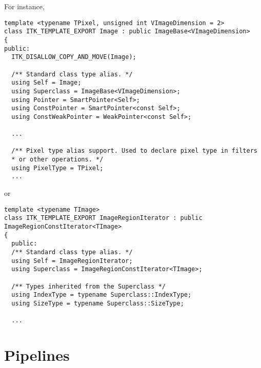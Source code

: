 For instance,

\small
\begin{verbatim}
template <typename TPixel, unsigned int VImageDimension = 2>
class ITK_TEMPLATE_EXPORT Image : public ImageBase<VImageDimension>
{
public:
  ITK_DISALLOW_COPY_AND_MOVE(Image);

  /** Standard class type alias. */
  using Self = Image;
  using Superclass = ImageBase<VImageDimension>;
  using Pointer = SmartPointer<Self>;
  using ConstPointer = SmartPointer<const Self>;
  using ConstWeakPointer = WeakPointer<const Self>;

  ...

  /** Pixel type alias support. Used to declare pixel type in filters
  * or other operations. */
  using PixelType = TPixel;
  ...
\end{verbatim}
\normalsize

or

\small
\begin{verbatim}
template <typename TImage>
class ITK_TEMPLATE_EXPORT ImageRegionIterator : public ImageRegionConstIterator<TImage>
{
  public:
  /** Standard class type alias. */
  using Self = ImageRegionIterator;
  using Superclass = ImageRegionConstIterator<TImage>;

  /** Types inherited from the Superclass */
  using IndexType = typename Superclass::IndexType;
  using SizeType = typename Superclass::SizeType;

  ...
\end{verbatim}
\normalsize


\section{Pipelines}
\label{sec:Pipelines}

